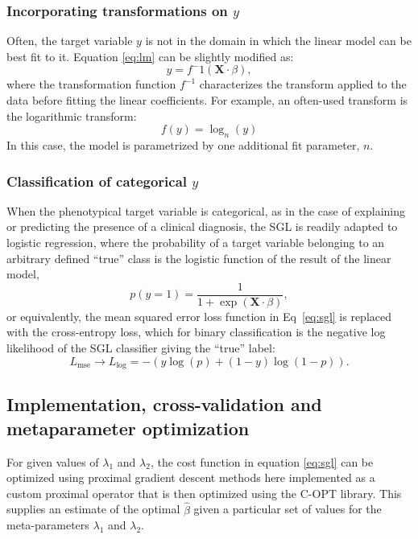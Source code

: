 \subsubsection*{Incorporating transformations on $y$}

Often, the target variable $y$ is not in the domain in which the linear model
can be best fit to it. Equation \ref{eq:lm} can be slightly modified as:
\begin{equation}
y = f^-1(\mathbf{X} \cdot \beta),
\label{eq:lm}
\end{equation}
where the transformation function $f^{-1}$ characterizes the transform applied
to the data before fitting the linear coefficients. For example, an often-used
transform is the logarithmic transform:
\begin{equation}
f(y) = \log_n(y)
\label{eq:log_nonlinearity}
\end{equation}
In this case, the model is parametrized by one additional fit parameter, $n$.

\subsubsection*{Classification of categorical $y$}
When the phenotypical target variable is categorical, as in the case of
explaining or predicting the presence of a clinical diagnosis, the SGL is
readily adapted to logistic regression, where the probability of a target
variable belonging to an arbitrary defined ``true'' class is the logistic
function of the result of the linear model,
\begin{equation}
    p(y = 1) = \frac{1}{1 + \exp(\mathbf{X}\cdot \beta)},
    \label{eq:logit}
\end{equation}
or equivalently, the mean squared error loss function in Eq~\eqref{eq:sgl} is
replaced with the cross-entropy loss, which for binary classification is the
negative log likelihood of the SGL classifier giving the ``true'' label:
\begin{equation}
    L_{\text{mse}} \rightarrow L_{\log} =
    -\left(y \log(p) + (1 - y) \log(1 - p)\right).
    \label{eq:logloss}
\end{equation}

\subsection*{Implementation, cross-validation and metaparameter optimization}

For given values of $\lambda_1$ and $\lambda_2$, the cost function in equation
\ref{eq:sgl} can be optimized using proximal gradient descent methods
\cite{parikh2014proximal} here implemented as a custom proximal operator that is
then optimized using the C-OPT library\cite{copt}. This supplies an estimate of
the optimal $\widehat{\beta}$ given a particular set of values for the
meta-parameters $\lambda_1$ and $\lambda_2$.

